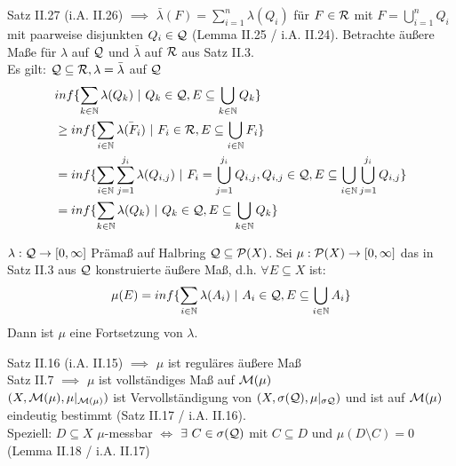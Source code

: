 \documentclass[11pt,a4paper,fleqn,openany]{report}
\begin{document}
    \begin{remark}
      Satz II.27 (i.A. II.26) $\implies$ $\bar{\lambda}(F) = \sum\limits_{i=1}^n \lambda(Q_i)$ für $F \in \mathcal{R}$ mit $F=\bigcup\limits_{i=1}^n Q_i$ mit paarweise disjunkten $Q_i \in \mathcal{Q}$ (Lemma II.25 / i.A. II.24). Betrachte äußere Maße für $\lambda$ auf $\mathcal{Q}$ und $\bar{\lambda}$ auf $\mathcal{R}$ aus Satz II.3.\\
      Es gilt: $\mathcal{Q} \subseteq \mathcal{R}, \lambda = \bar{\lambda}$ auf $\mathcal{Q}$
      \begin{align*}
        & inf\{\sum\limits_{k \in \mathbb{N}} \lambda(Q_k) \ | \ Q_k \in \script{Q}, E \subseteq \bigcup\limits_{k \in \mathbb{N}} Q_k\}\\
        &\geq inf\{\sum\limits_{i \in \mathbb{N}} \bar{\lambda(F_i)} \ | \ F_i \in \script{R}, E \subseteq \bigcup\limits_{i \in \mathbb{N}} F_i\}\\
        &= inf\{ \sum\limits_{i \in \mathbb{N}} \sum\limits_{j=1}^{j_i} \lambda(Q_{i,j}) \ | \ F_i = \bigcup\limits_{j=1}^{j_i} Q_{i,j}, Q_{i,j} \in \script{Q}, E \subseteq \bigcup\limits_{i \in \mathbb{N}} \bigcup\limits_{j=1}^{j_i} Q_{i,j}\}\\
        &= inf\{\sum\limits_{k \in \mathbb{N}} \lambda(Q_k) \ | \ Q_k \in \script{Q}, E \subseteq \bigcup\limits_{k \in \mathbb{N}} Q_k\}
      \end{align*}
    \end{remark}

    \begin{theorem}[(i.A. II.30)]
      $\lambda: \mathcal{Q} \to [0, \infty]$ Prämaß auf Halbring $\mathcal{Q} \subseteq \mathcal{P}(X)$. Sei $\mu:\mathcal{P}(X) \to [0,\infty]$ das in Satz II.3 aus $\mathcal{Q}$ konstruierte äußere Maß, d.h. $\forall E \subseteq X$ ist:
      \begin{align*}
        \mu(E) = inf\{\sum\limits_{i \in \mathbb{N}} \lambda(A_i) \ | \ A_i \in \script{Q}, E \subseteq \bigcup\limits_{i \in \mathbb{N}}A_i \}
      \end{align*}
      Dann ist $\mu$ eine Fortsetzung von $\lambda$.
    \end{theorem}

    \begin{remark}
      Satz II.16 (i.A. II.15) $\implies$ $\mu$ ist reguläres äußere Maß\\
      Satz II.7 $\implies$ $\mu$ ist vollständiges Maß auf $\mathcal{M}(\mu)$\\
      $(X, \mathcal{M}(\mu), \mu|_{\mathcal{M}(\mu)})$ ist Vervollständigung von $(X, \sigma(\mathcal{Q}), \mu|_{\sigma{\mathcal{Q}}})$ und ist auf $\mathcal{M}(\mu)$ eindeutig bestimmt (Satz II.17 / i.A. II.16).\\
      Speziell: $D \subseteq X$ $\mu$-messbar $\Leftrightarrow$ $\exists \ C \in \sigma(\mathcal{Q})$ mit $C \subseteq D$ und $\mu(D \setminus C) = 0$ (Lemma II.18 / i.A. II.17)
    \end{remark}
\end{document}
